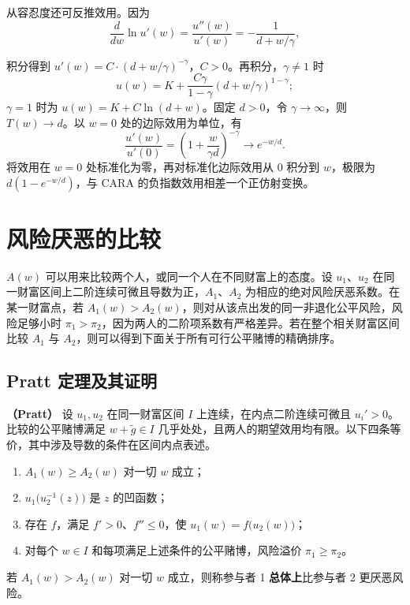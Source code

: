 从容忍度还可反推效用。因为
\[
 \frac{d}{dw}\ln u'(w)=\frac{u''(w)}{u'(w)}=-\frac1{d+w/\gamma},
\]

积分得到 $u'(w)=C\cdot(d+w/\gamma)^{-\gamma}$，$C>0$。再积分，$\gamma\ne1$ 时
\[
 u(w)=K+\frac{C\gamma}{1-\gamma}(d+w/\gamma)^{1-\gamma};
\]
$\gamma=1$ 时为 $u(w)=K+C\ln(d+w)$。固定 $d>0$，令 $\gamma\to\infty$，则 $T(w)\to d$。以 $w=0$ 处的边际效用为单位，有
\[
 \frac{u'(w)}{u'(0)}
 =\left(1+\frac{w}{\gamma d}\right)^{-\gamma}
 \longrightarrow e^{-w/d}.
\]
将效用在 $w=0$ 处标准化为零，再对标准化边际效用从 $0$ 积分到 $w$，极限为 $d(1-e^{-w/d})$，与 CARA 的负指数效用相差一个正仿射变换。

\section{风险厌恶的比较}\label{sec:wj-seven-5}
$A(w)$ 可以用来比较两个人，或同一个人在不同财富上的态度。设 $u_1$、$u_2$ 在同一财富区间上二阶连续可微且导数为正，$A_1$、$A_2$ 为相应的绝对风险厌恶系数。在某一财富点，若 $A_1(w)>A_2(w)$，则对从该点出发的同一非退化公平风险，风险足够小时 $\pi_1>\pi_2$，因为两人的二阶项系数有严格差异。若在整个相关财富区间比较 $A_1$ 与 $A_2$，则可以得到下面关于所有可行公平赌博的精确排序。

\subsection{Pratt 定理及其证明}
\begin{tcolorbox}[knowledge]
\textbf{（Pratt）} 设 $u_1,u_2$ 在同一财富区间 $I$ 上连续，在内点二阶连续可微且 $u_i'>0$。比较的公平赌博满足 $w+\tilde g\in I$ 几乎处处，且两人的期望效用均有限。以下四条等价，其中涉及导数的条件在区间内点表述。
\begin{enumerate}
    \item $A_1(w)\ge A_2(w)$ 对一切 $w$ 成立；
    \item $u_1\bigl(u_2^{-1}(z)\bigr)$ 是 $z$ 的凹函数；
    \item 存在 $f$，满足 $f'>0$、$f''\le 0$，使 $u_1(w)=f\bigl(u_2(w)\bigr)$；
    \item 对每个 $w\in I$ 和每项满足上述条件的公平赌博，风险溢价 $\pi_1\ge\pi_2$。
\end{enumerate}
若 $A_1(w)>A_2(w)$ 对一切 $w$ 成立，则称参与者 1 \textbf{总体上}比参与者 2 更厌恶风险。
\end{tcolorbox}

